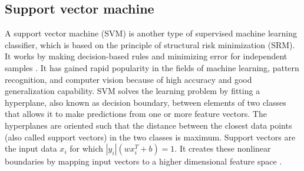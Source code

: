 \subsection{Support vector machine}
A support vector machine (SVM) is another type of supervised machine learning classifier, which is based on the principle of structural risk minimization (SRM). 
It works by making decision-based rules and minimizing error for independent samples \cite{svm2008}. It has gained rapid popularity in the fields of machine learning, pattern recognition, and computer vision because of high accuracy and good generalization capability. SVM solves the learning problem by fitting a hyperplane, also known as decision boundary, between elements of two classes that allows it to make predictions from one or more feature vectors. The hyperplanes are oriented such that the distance between the closest data points (also called support vectors) in the two classes is maximum. Support vectors are the input data $x_i$ for which $|y_i|(wx_i^T + b)=1$. It creates these nonlinear boundaries by mapping input vectors to a higher dimensional feature space \cite{SAMANTA2003657,Nakajima2016}.


